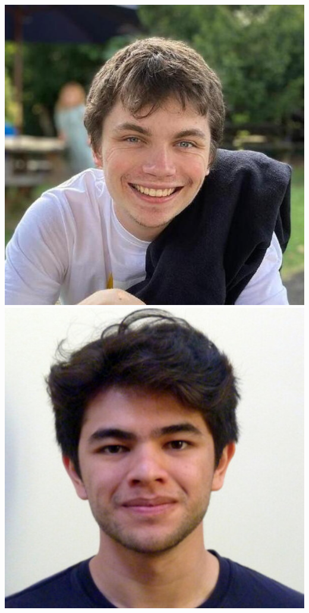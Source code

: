 \documentclass[aspectratio=169]{beamer}
\begin{document}
\begin{frame}
{            \includegraphics[width=0.09\textheight]{figures/students/harry_bevins.jpg}%
            \includegraphics[width=0.09\textheight]{figures/students/ian_roque.jpg}%
}
\end{frame}
\end{document}
